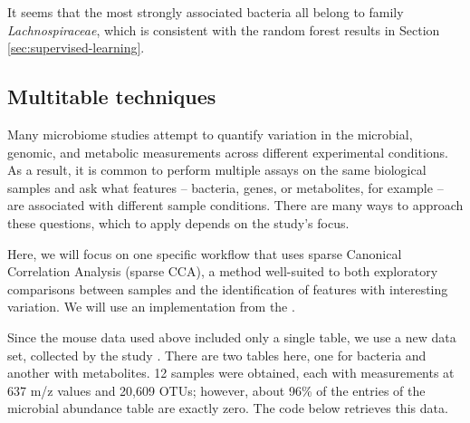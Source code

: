 It seems that the most strongly associated bacteria all belong to
family \emph{Lachnospiraceae}, which is consistent with the random forest
results in Section \ref{sec:supervised-learning}.

\subsection*{Multitable techniques}

Many microbiome studies attempt to quantify variation in the
microbial, genomic, and metabolic measurements across different
experimental conditions. As a result, it is common to perform multiple
assays on the same biological samples and ask what features -- bacteria,
genes, or metabolites, for example -- are associated with different sample
conditions. There are many ways to approach these questions, which to
apply depends on the study's focus.

Here, we will focus on one specific workflow that uses sparse
Canonical Correlation Analysis (sparse CCA), a method well-suited to
both exploratory comparisons between samples and the identification of
features with interesting variation. We will use an implementation
from the   \cite{witten2009pma}.

Since the mouse data used above included only a single table, we use a
new data set, collected by the study
\cite{kashyap2013genetically}. There are two tables here, one for
bacteria and another with metabolites. 12 samples were obtained, each
with measurements at 637 m/z values and 20,609 OTUs; however, about
96\% of the entries of the microbial abundance table are exactly
zero. The code below retrieves this data.

\begin{knitrout}
\color{fgcolor}\begin{kframe}
\begin{alltt}
\hlstd{(}\hlstd{(}\hlstd{,} \hlstd{,} \hlstd{,} \hlstd{,} \hlstd{,}
                \hlstd{,} \hlstd{))}

 \hlkwb{<-} 
 \hlkwb{<-} 
 \hlkwb{<-}   \hlstd{=} \hlstd{)}
 \hlkwb{<-} 
 \hlkwb{<-} \hlstd{(}
\end{alltt}
\end{kframe}
\end{knitrout}


